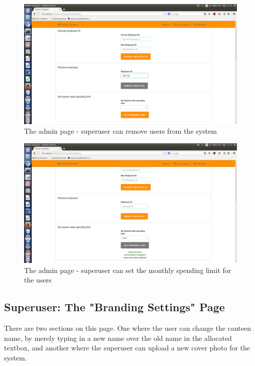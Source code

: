 \documentclass[a4paper,12pt]{report}
\begin{document}
\begin{figure}[H]
  \centering
    \includegraphics[width=1.0\textwidth]{screenshots/removeUser.png}
    \caption{The admin page - superuser can remove users from the system} 
\end{figure}

\begin{figure}[H]
  \centering
    \includegraphics[width=1.0\textwidth]{screenshots/setLimit.png}
    \caption{The admin page - superuser can set the monthly spending limit for the users} 
\end{figure}

\subsection{Superuser: The "Branding Settings" Page} 
There are two sections on this page. One where the user can change the canteen name, by merely typing in a new name over the old name in the allocated textbox, and another where the superuser can upload a new cover photo for the system.
\end{document}
